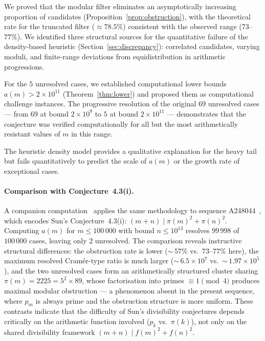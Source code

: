 \documentclass[pdflatex,sn-mathphys-num,Numbered]{sn-jnl}
\theoremstyle{thmstyleone}
\theoremstyle{thmstylethree}
\theoremstyle{thmstyletwo}
\numberwithin{equation}{section}
\begin{document}
We proved that the modular filter eliminates an asymptotically
increasing proportion of candidates
(Proposition~\ref{prop:obstruction}), with the theoretical rate
for the truncated filter ($\approx 78.5\%$) consistent with the
observed range ($73$--$77\%$).
We identified three structural sources for the quantitative failure
of the density-based heuristic (Section~\ref{sec:discrepancy}):
correlated candidates, varying moduli, and finite-range deviations
from equidistribution in arithmetic progressions.

For the $5$ unresolved cases, we established computational lower bounds
$a(m) > 2 \times 10^{11}$ (Theorem~\ref{thm:lower}) and proposed
them as computational challenge instances.
The progressive resolution of the original $69$ unresolved cases
--- from $69$ at bound $2 \times 10^9$ to $5$ at bound
$2 \times 10^{11}$ --- demonstrates that the conjecture was verified
computationally for all but the most arithmetically resistant values
of $m$ in this range.

The heuristic density model provides a qualitative explanation for the
heavy tail but fails quantitatively to predict the scale of $a(m)$ or
the growth rate of exceptional cases.

\paragraph{Comparison with Conjecture~4.3(i).}
A companion computation~\cite{CortiA248044} applies the same
methodology to sequence A248044~\cite{OEIS_A248044}, which encodes
Sun's Conjecture~4.3(i): $(m+n) \mid \pi(m)^2 + \pi(n)^2$.
Computing $a(m)$ for $m \leq 100\,000$ with bound $n \leq 10^{13}$
resolves $99\,998$ of $100\,000$ cases, leaving only $2$ unresolved.
The comparison reveals instructive structural differences:
the obstruction rate is lower (${\sim}\,57\%$ vs.\ $73$--$77\%$
here), the maximum resolved Cram\'er-type ratio is much larger
(${\sim}\,6.5 \times 10^7$ vs.\ ${\sim}\,1.97 \times 10^5$),
and the two unresolved cases form an arithmetically structured
cluster sharing $\pi(m) = 2225 = 5^2 \times 89$, whose
factorisation into primes $\equiv 1 \pmod{4}$ produces maximal
modular obstruction --- a phenomenon absent in the present sequence,
where $p_m$ is always prime and the obstruction structure is more
uniform.
These contrasts indicate that the difficulty of Sun's divisibility
conjectures depends critically on the arithmetic function involved
($p_k$ vs.\ $\pi(k)$), not only on the shared divisibility
framework $(m+n) \mid f(m)^2 + f(n)^2$.
\end{document}
